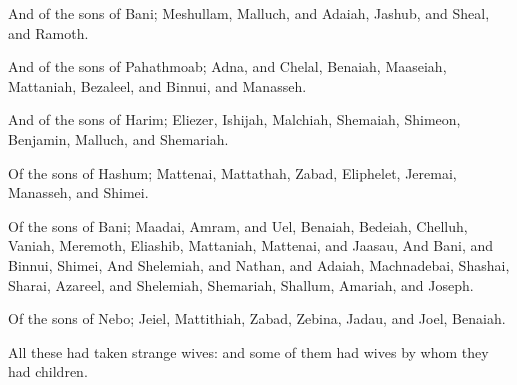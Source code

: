 \Verse And of the sons of Bani; Meshullam, Malluch, and Adaiah, Jashub, and Sheal, and Ramoth.

\Verse And of the sons of Pahathmoab; Adna, and Chelal, Benaiah, Maaseiah, Mattaniah, Bezaleel, and Binnui, and Manasseh.

\Verse And of the sons of Harim; Eliezer, Ishijah, Malchiah, Shemaiah, Shimeon, \Verse Benjamin, Malluch, and Shemariah.

\Verse Of the sons of Hashum; Mattenai, Mattathah, Zabad, Eliphelet, Jeremai, Manasseh, and Shimei.

\Verse Of the sons of Bani; Maadai, Amram, and Uel, \Verse Benaiah, Bedeiah, Chelluh, \Verse Vaniah, Meremoth, Eliashib, \Verse Mattaniah, Mattenai, and Jaasau, \Verse And Bani, and Binnui, Shimei, \Verse And Shelemiah, and Nathan, and Adaiah, \Verse Machnadebai, Shashai, Sharai, \Verse Azareel, and Shelemiah, Shemariah, \Verse Shallum, Amariah, and Joseph.

\Verse Of the sons of Nebo; Jeiel, Mattithiah, Zabad, Zebina, Jadau, and Joel, Benaiah.

\Verse All these had taken strange wives: and some of them had wives by whom they had children.

